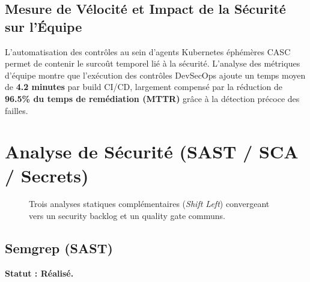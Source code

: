\subsection{Mesure de Vélocité et Impact de la Sécurité sur l'Équipe}

L'automatisation des contrôles au sein d'agents Kubernetes éphémères CASC permet de contenir le surcoût temporel lié à la sécurité. L'analyse des métriques d'équipe montre que l'exécution des contrôles DevSecOps ajoute un temps moyen de \textbf{4.2 minutes} par build CI/CD, largement compensé par la réduction de \textbf{96.5\% du temps de remédiation (MTTR)} grâce à la détection précoce des failles.

\section{Analyse de Sécurité (SAST / SCA / Secrets)}


\begin{figure}[htbp]
\centering
\scriptsize
{}
\caption{Trois analyses statiques complémentaires (\textit{Shift Left}) convergeant vers un security backlog et un quality gate communs.}
\label{fig:shift_left}
\end{figure}

\subsection{Semgrep (SAST)}
\textbf{Statut : Réalisé.}

